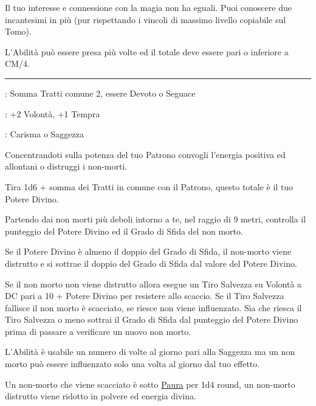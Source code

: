 \begin{multicols}{2}
Il tuo interesse e connessione con la magia non ha eguali. Puoi conoscere due incantesimi in più (pur rispettando i vincoli di massimo livello copiabile sul Tomo).

L'Abilità può essere presa più volte ed il totale deve essere pari o inferiore a CM/4.

\smallskip\noindent\rule{\linewidth}{2pt} \hypertarget{Scacciare i non morti}{}\medskip{}
\noindent
\begin{description}[noitemsep, topsep=0pt, parsep=0pt, partopsep=0pt, leftmargin=0cm, labelwidth=2.5cm]
    \item[\textbf{Requisito}]: Somma Tratti comune 2, essere Devoto o Seguace
    \item[\textbf{Tiri Salvezza}]: +2 Volontà, +1 Tempra
    \item[\textbf{Caratteristica}]: Carisma o Saggezza
\end{description}

Concentrandoti sulla potenza del tuo Patrono convogli l'energia positiva ed allontani o distruggi i non-morti.

Tira 1d6 + somma dei Tratti in comune con il Patrono, questo totale è il tuo Potere Divino.

Partendo dai non morti più deboli intorno a te, nel raggio di 9 metri, controlla il punteggio del Potere Divino ed il Grado di Sfida del non morto.

Se il Potere Divino è almeno il doppio del Grado di Sfida, il non-morto viene distrutto e si sottrae il doppio del Grado di Sfida dal valore del Potere Divino.

Se il non morto non viene distrutto allora esegue un Tiro Salvezza su Volontà a DC pari a 10 + Potere Divino per resistere allo scaccio. Se il Tiro Salvezza fallisce il non morto è scacciato, se riesce non viene influenzato. Sia che riesca il Tiro Salvezza o meno sottrai il Grado di Sfida dal punteggio del Potere Divino prima di passare a verificare un nuovo non morto.

L'Abilità è usabile un numero di volte al giorno pari alla Saggezza ma un non morto può essere influenzato solo una volta al giorno dal tuo effetto.

Un non-morto che viene scacciato è sotto \hyperlink{condizionepaura}{Paura} per 1d4 round, un non-morto distrutto viene ridotto in polvere ed energia divina.


\end{multicols}
